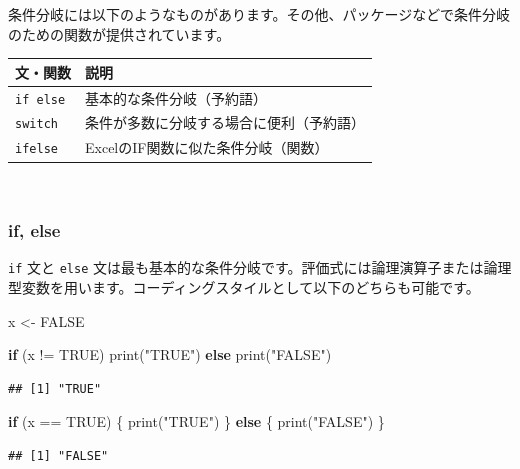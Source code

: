 \documentclass[
  12pt,
]{book}
\newenvironment{Shaded}{\begin{snugshade}}{\end{snugshade}}
\newcommand{\ConstantTok}[1]{\textcolor[rgb]{0.00,0.00,0.00}{#1}}
\newcommand{\ControlFlowTok}[1]{\textcolor[rgb]{0.13,0.29,0.53}{\textbf{#1}}}
\newcommand{\FunctionTok}[1]{\textcolor[rgb]{0.00,0.00,0.00}{#1}}
\newcommand{\NormalTok}[1]{#1}
\newcommand{\OtherTok}[1]{\textcolor[rgb]{0.56,0.35,0.01}{#1}}
\newcommand{\SpecialCharTok}[1]{\textcolor[rgb]{0.00,0.00,0.00}{#1}}
\newcommand{\StringTok}[1]{\textcolor[rgb]{0.31,0.60,0.02}{#1}}
\begin{document}
条件分岐には以下のようなものがあります。その他、パッケージなどで条件分岐のための関数が提供されています。

\begin{longtable}[]{@{}ll@{}}
\toprule
文・関数 & 説明 \\
\midrule
\endhead
\texttt{if\ else} & 基本的な条件分岐（予約語） \\
\texttt{switch} & 条件が多数に分岐する場合に便利（予約語） \\
\texttt{ifelse} & ExcelのIF関数に似た条件分岐（関数） \\
\bottomrule
\end{longtable}

　

\hypertarget{if-else}{%
\subsubsection{if, else}\label{if-else}}

\texttt{if} 文と \texttt{else} 文は最も基本的な条件分岐です。評価式には論理演算子または論理型変数を用います。コーディングスタイルとして以下のどちらも可能です。

\begin{Shaded}
\begin{Highlighting}[numbers=left,,]
\NormalTok{x }\OtherTok{\textless{}{-}} \ConstantTok{FALSE}

\ControlFlowTok{if}\NormalTok{ (x }\SpecialCharTok{!=} \ConstantTok{TRUE}\NormalTok{) }\FunctionTok{print}\NormalTok{(}\StringTok{"TRUE"}\NormalTok{) }\ControlFlowTok{else} \FunctionTok{print}\NormalTok{(}\StringTok{"FALSE"}\NormalTok{)}
\end{Highlighting}
\end{Shaded}

\begin{verbatim}
## [1] "TRUE"
\end{verbatim}

\begin{Shaded}
\begin{Highlighting}[numbers=left,,]
\ControlFlowTok{if}\NormalTok{ (x }\SpecialCharTok{==} \ConstantTok{TRUE}\NormalTok{) \{}
  \FunctionTok{print}\NormalTok{(}\StringTok{"TRUE"}\NormalTok{)}
\NormalTok{\} }\ControlFlowTok{else}\NormalTok{ \{}
  \FunctionTok{print}\NormalTok{(}\StringTok{"FALSE"}\NormalTok{)}
\NormalTok{\}}
\end{Highlighting}
\end{Shaded}

\begin{verbatim}
## [1] "FALSE"
\end{verbatim}
\end{document}
